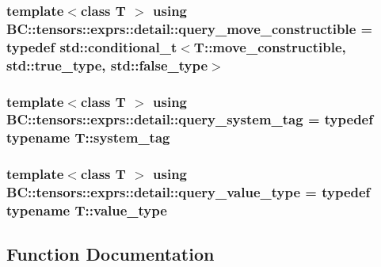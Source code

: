 \subsubsection[{\texorpdfstring{query\+\_\+move\+\_\+constructible}{query_move_constructible}}]{\setlength{\rightskip}{0pt plus 5cm}template$<$class T $>$ using {\bf B\+C\+::tensors\+::exprs\+::detail\+::query\+\_\+move\+\_\+constructible} = typedef std\+::conditional\+\_\+t$<$T\+::move\+\_\+constructible, std\+::true\+\_\+type, std\+::false\+\_\+type$>$}\hypertarget{namespaceBC_1_1tensors_1_1exprs_1_1detail_a483b7cde02faa7f11f8c5dda84013764}{}\label{namespaceBC_1_1tensors_1_1exprs_1_1detail_a483b7cde02faa7f11f8c5dda84013764}
\subsubsection[{\texorpdfstring{query\+\_\+system\+\_\+tag}{query_system_tag}}]{\setlength{\rightskip}{0pt plus 5cm}template$<$class T $>$ using {\bf B\+C\+::tensors\+::exprs\+::detail\+::query\+\_\+system\+\_\+tag} = typedef typename T\+::system\+\_\+tag}\hypertarget{namespaceBC_1_1tensors_1_1exprs_1_1detail_a78ddbc90d8902249df20ae15022d9274}{}\label{namespaceBC_1_1tensors_1_1exprs_1_1detail_a78ddbc90d8902249df20ae15022d9274}
\subsubsection[{\texorpdfstring{query\+\_\+value\+\_\+type}{query_value_type}}]{\setlength{\rightskip}{0pt plus 5cm}template$<$class T $>$ using {\bf B\+C\+::tensors\+::exprs\+::detail\+::query\+\_\+value\+\_\+type} = typedef typename T\+::value\+\_\+type}\hypertarget{namespaceBC_1_1tensors_1_1exprs_1_1detail_aa067d25adc2a68a08de1456648d9bf2c}{}\label{namespaceBC_1_1tensors_1_1exprs_1_1detail_aa067d25adc2a68a08de1456648d9bf2c}


\subsection{Function Documentation}
